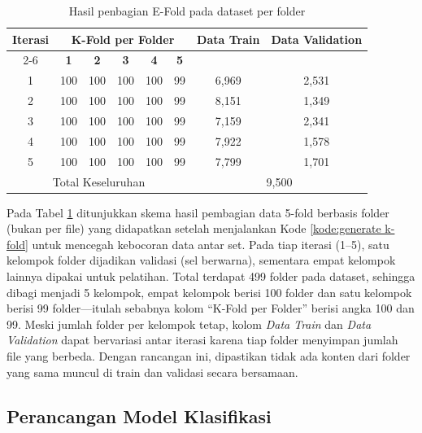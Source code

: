 \begin{table}[H]
    \centering
    \caption{Hasil penbagian E-Fold pada dataset per folder }
    \label{tab:data k-fold}
    \begin{tabular}{|c|c|c|c|c|c|c|c|}
        \hline
        \multirow{2}{*}{\textbf{Iterasi}} & \multicolumn{5}{c|}{\textbf{K-Fold per Folder}} & \multirow{2}{*}{\textbf{Data Train}} & \multirow{2}{*}{\textbf{Data Validation}} \\ \cline{2-6}
         & \textbf{1} & \textbf{2} & \textbf{3} & \textbf{4} & \textbf{5} & & \\ \hline 
        1 & \cellcolor{yellow}100 & 100 & 100 & 100 & 99 & 6,969 & 2,531 \\ \hline
        2 & 100 & \cellcolor{yellow}100 & 100 & 100 & 99 & 8,151 & 1,349 \\ \hline
        3 & 100 & 100 & \cellcolor{yellow}100 & 100 & 99 & 7,159 & 2,341 \\ \hline
        4 & 100 & 100 & 100 & \cellcolor{yellow}100 & 99 & 7,922 & 1,578 \\ \hline
        5 & 100 & 100 & 100 & 100 & \cellcolor{yellow}99 & 7,799 & 1,701 \\ \hline
        \multicolumn{6}{|c|}{Total Keseluruhan} & \multicolumn{2}{c|}{9,500}\\ \hline
    \end{tabular}
\end{table}

Pada Tabel \ref{tab:data k-fold} ditunjukkan skema hasil pembagian data 5-fold berbasis folder (bukan per file) yang didapatkan setelah menjalankan Kode \ref{kode:generate k-fold} untuk mencegah kebocoran data antar set. Pada tiap iterasi (1–5), satu kelompok folder dijadikan validasi (sel berwarna), sementara empat kelompok lainnya dipakai untuk pelatihan. Total terdapat 499 folder pada dataset, sehingga dibagi menjadi 5 kelompok, empat kelompok berisi 100 folder dan satu kelompok berisi 99 folder—itulah sebabnya kolom “K-Fold per Folder” berisi angka 100 dan 99. Meski jumlah folder per kelompok tetap, kolom \textit{Data Train} dan \textit{Data Validation} dapat bervariasi antar iterasi karena tiap folder menyimpan jumlah file yang berbeda. Dengan rancangan ini, dipastikan tidak ada konten dari folder yang sama muncul di train dan validasi secara bersamaan. \par


\subsection{Perancangan Model Klasifikasi} \label{IV.Perancangan}

